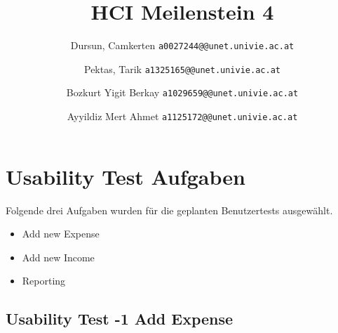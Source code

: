 \documentclass[runningheads,a4paper]{llncs}
\begin{document}
\mainmatter  %

\title{HCI Meilenstein 4}


\author{
  Dursun, Camkerten
  \texttt{a0027244@@unet.univie.ac.at}
  \and
  Pektas, Tarik
  \texttt{a1325165@@unet.univie.ac.at}
  \and
  Bozkurt Yigit Berkay
  \texttt{a1029659@@unet.univie.ac.at}
  \and
  Ayyildiz Mert Ahmet
  \texttt{a1125172@@unet.univie.ac.at}
}



\maketitle

\section{Usability Test Aufgaben}
Folgende drei Aufgaben wurden für die geplanten Benutzertests ausgewählt.

\begin{itemize}
\item Add new Expense
\item Add new Income
\item Reporting
\end {itemize}


\subsection{Usability Test -1 Add Expense}
\end{document}
